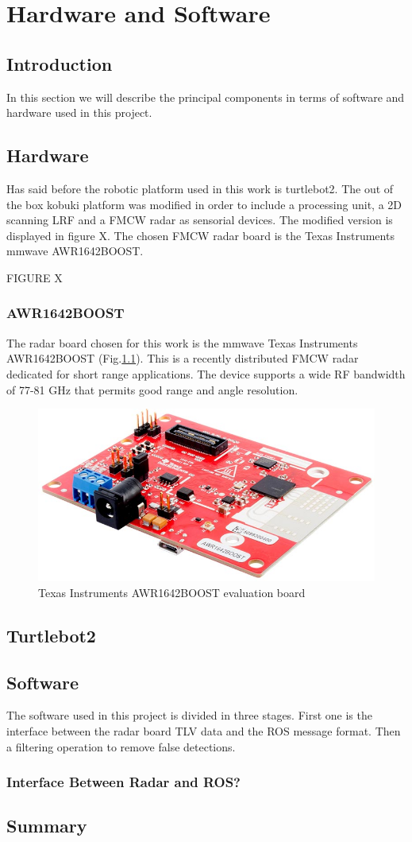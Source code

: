 \chapter{Hardware and Software}

\section{Introduction}
In this section we will describe the principal components in terms of software and hardware used in this project.
\section{Hardware}
Has said before the robotic platform used in this work is turtlebot2. The out of the box kobuki platform was modified in order to include a processing unit, a 2D scanning \ac{LRF} and a \ac{FMCW} radar as sensorial devices. The modified version is displayed in figure X.  The chosen \ac{FMCW} radar board is the Texas Instruments mmwave AWR1642BOOST.

FIGURE X
\subsection{AWR1642BOOST}

The radar board chosen for this work is the mmwave Texas Instruments AWR1642BOOST (Fig.\ref{fig:awr}). This is a recently distributed \ac{FMCW} radar dedicated for short range applications. The device supports a wide RF bandwidth of 77-81 GHz that permits good range and angle resolution.

\begin{figure}[h] 
\centerline{\includegraphics [width=0.5 \textwidth]{imgs/chapter4/awr1642.jpg}}
\caption{Texas Instruments AWR1642BOOST evaluation board}
\label{fig:awr}
\end{figure}

\subsection{}

\section{Turtlebot2}
\section{Software}
The software used in this project is divided in three stages. First one is the interface between the radar board TLV data and the ROS message format. Then a filtering operation to remove false detections. 
\subsection{Interface Between Radar and ROS?}


\section{Summary}   

